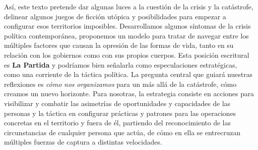Así, este texto pretende dar algunas luces a la cuestión de la crisis y la catástrofe, delinear algunos juegos de ficción utópica y posibilidades para empezar a configurar esos territorios imposibles. Desarrollamos algunos síntomas de la crisis política contemporánea, proponemos un modelo para tratar de navegar entre los múltiples factores que causan la opresión de las formas de vida, tanto en su relación con los gobiernos como con sus propios cuerpos. Esta posición escritural es \textbf{La Partida} y podríamos bien señalarla como especulaciones estratégicas, como una corriente de la táctica política. La pregunta central que guiará nuestras reflexiones es \emph{cómo nos organizamos} para un más allá de la catástrofe, cómo creamos un nuevo horizonte. Para nosotras, la estrategia consiste en acciones para visibilizar y combatir las asimetrías de oportunidades y capacidades de las personas y la táctica en configurar prácticas y patrones para las operaciones concretas en el territorio y fuera de él, partiendo del reconocimiento de las circunstancias de cualquier persona que actúa, de cómo en ella se entrecruzan múltiples fuerzas de captura a distintas velocidades.